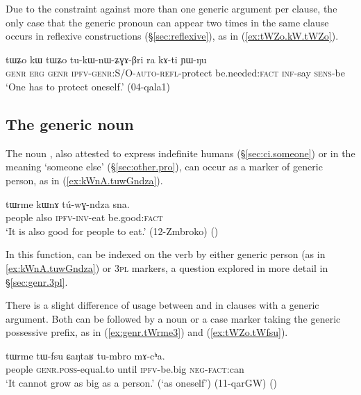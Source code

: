 Due to the constraint against more than one generic argument per clause, the only case that the generic pronoun can appear two times in the same clause occurs in reflexive constructions (§\ref{sec:reflexive}), as in (\ref{ex:tWZo.kW.tWZo}).

\begin{exe}
\ex \label{ex:tWZo.kW.tWZo}
\gll tɯʑo kɯ tɯʑo tu-kɯ-nɯ-ʑɣɤ-βri ra kɤ-ti ɲɯ-ŋu \\
\textsc{genr} \textsc{erg} \textsc{genr} \textsc{ipfv}-\textsc{genr}:S/O-\textsc{auto}-\textsc{refl}-protect be.needed:\textsc{fact} \textsc{inf}-say \textsc{sens}-be \\
\glt `One has to protect oneself.' (04-qala1)
\end{exe} 

\subsection{The generic noun } \label{sec:tWrme.generic}
The noun , also attested to express indefinite humans (§\ref{sec:ci.someone}) or in the meaning `someone else' (§\ref{sec:other.pro}), can occur as a marker of generic person, as in (\ref{ex:kWnA.tuwGndza}).
 
\begin{exe}
\ex \label{ex:kWnA.tuwGndza}
\gll  tɯrme kɯnɤ tú-wɣ-ndza sna. \\
 people also \textsc{ipfv}-\textsc{inv}-eat be.good:\textsc{fact} \\
\glt `It is also good for people to eat.' (12-Zmbroko) ()
\end{exe}
 
In this function,  can be indexed on the verb by either generic person (as in \ref{ex:kWnA.tuwGndza}) or \textsc{3pl} markers, a question explored in more detail in §\ref{sec:genr.3pl}.

There is a slight difference of usage between  and  in clauses with a generic argument. Both can be followed by a noun or a case marker taking the generic possessive prefix, as in (\ref{ex:genr.tWrme3}) and (\ref{ex:tWZo.tWfsu}). 

\begin{exe}
\ex  \label{ex:genr.tWrme3}
\gll tɯrme tɯ-fsu ɕaŋtaʁ tu-mbro mɤ-cʰa. \\
people \textsc{genr}.\textsc{poss}-equal.to until \textsc{ipfv}-be.big \textsc{neg}-\textsc{fact}:can \\ 
\glt `It cannot grow as big as a person.' (`as oneself') (11-qarGW)
()
\end{exe}

